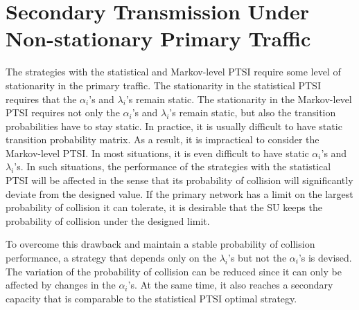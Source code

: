 \documentclass[10pt,final,journal,letterpaper]{IEEEtran}
\begin{document}
\section{Secondary Transmission Under Non-stationary Primary Traffic}\label{sec:5}
The strategies with the statistical and Markov-level PTSI require some level of stationarity in the primary traffic. The stationarity in the statistical PTSI requires that the $\alpha_i$'s and $\lambda_i$'s remain static. The stationarity in the Markov-level PTSI requires not only the $\alpha_i$'s and $\lambda_i$'s remain static, but also the transition probabilities have to stay static. In practice, it is usually difficult to have static transition probability matrix. As a result, it is impractical to consider the Markov-level PTSI. In most situations, it is even difficult to have static $\alpha_i$'s and $\lambda_i$'s. In such situations, the performance of the strategies with the statistical PTSI will be affected in the sense that its probability of collision will significantly deviate from the designed value. If the primary network has a limit on the largest probability of collision it can tolerate, it is desirable that the SU keeps the probability of collision under the designed limit.

To overcome this drawback and maintain a stable probability of collision performance, a strategy that depends only on the $\lambda_i$'s but not the $\alpha_i$'s is devised. The variation of the probability of collision can be reduced since it can only be affected by changes in the $\alpha_i$'s. At the same time, it also reaches a secondary capacity that is comparable to the statistical PTSI optimal strategy.
\end{document}
